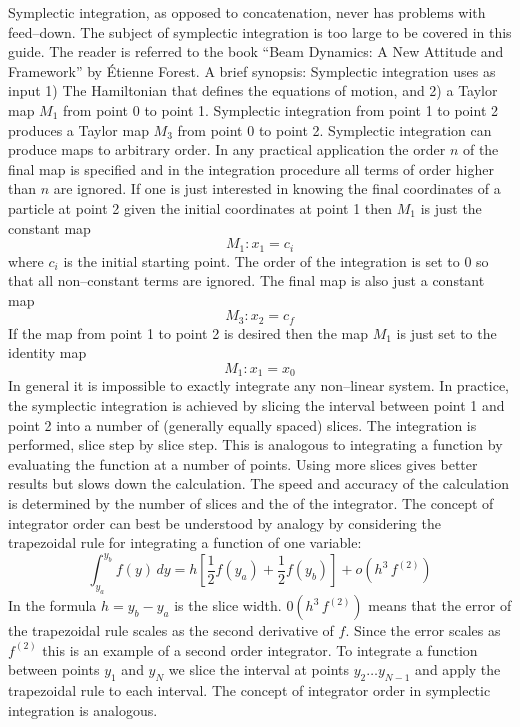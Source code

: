 Symplectic integration, as opposed to concatenation, never has
problems with feed--down. The subject of symplectic integration is too
large to be covered in this guide. The reader is referred to the book
``Beam Dynamics: A New Attitude and Framework'' by \'Etienne
Forest\cite{b:forest}. A brief synopsis: Symplectic integration uses
as input 1) The Hamiltonian that defines the equations of motion, and
2) a Taylor map $M_1$ from point 0 to point 1. Symplectic integration
from point 1 to point 2 produces a Taylor map $M_3$ from point 0 to
point 2. Symplectic integration can produce maps to arbitrary
order. In any practical application the order $n$ of the final map is
specified and in the integration procedure all terms of order higher
than $n$ are ignored. If one is just interested in knowing the final
coordinates of a particle at point 2 given the initial coordinates at
point 1 then $M_1$ is just the constant map
\begin{equation}
  M_1: x_1 = c_i
\end{equation}
where $c_i$ is the initial starting point. The order of the integration is set to 0 so that all
non--constant terms are ignored. The final map is also just a constant map
\begin{equation}
  M_3: x_2 = c_f
\end{equation}
If the map from point 1 to point 2 is desired then the map $M_1$ is just set to the identity map
\begin{equation}
  M_1: x_1 = x_0
\end{equation}
In general it is impossible to exactly integrate any non--linear system. In practice, the symplectic
integration is achieved by slicing the interval between point 1 and point 2 into a number of
(generally equally spaced) slices. The integration is performed, slice step by slice step. This is
analogous to integrating a function by evaluating the function at a number of points. Using more
slices gives better results but slows down the calculation. The speed and accuracy of the
calculation is determined by the number of slices and the  of the integrator. The concept
of integrator order can best be understood by analogy by considering the trapezoidal rule for
integrating a function of one variable:
\begin{equation}
  \int_{y_a}^{y_b} f(y) \, dy = 
  h \left[ \frac{1}{2} f(y_a) + \frac{1}{2} f(y_b) \right] +
  o(h^3 \, f^{(2)})
\end{equation}
In the formula $h = y_b - y_a$ is the slice width. $0(h^3 \, f^{(2)})$ means that the error of the
trapezoidal rule scales as the second derivative of $f$. Since the error scales as $f^{(2)}$ this is
an example of a second order integrator. To integrate a function between points $y_1$ and $y_N$ we
slice the interval at points $y_2 \ldots y_{N-1}$ and apply the trapezoidal rule to each
interval. The concept of integrator order in symplectic integration is analogous.

